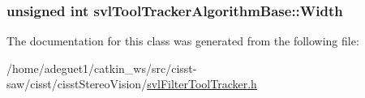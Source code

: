 \hypertarget{classsvl_tool_tracker_algorithm_base_a5dc173e2176c626b0550a2b6d4ef8f93}{
\subsubsection[{Width}]{\setlength{\rightskip}{0pt plus 5cm}unsigned int svl\-Tool\-Tracker\-Algorithm\-Base\-::\-Width\hspace{0.3cm}{\ttfamily [protected]}}}\label{classsvl_tool_tracker_algorithm_base_a5dc173e2176c626b0550a2b6d4ef8f93}


The documentation for this class was generated from the following file\-:\begin{DoxyCompactItemize}
\item 
/home/adeguet1/catkin\-\_\-ws/src/cisst-\/saw/cisst/cisst\-Stereo\-Vision/\hyperlink{svl_filter_tool_tracker_8h}{svl\-Filter\-Tool\-Tracker.\-h}\end{DoxyCompactItemize}
